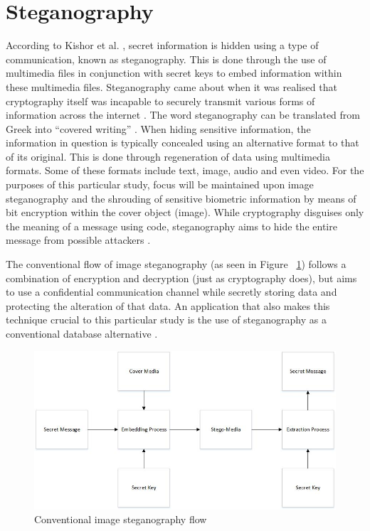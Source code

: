 \section[Steganography]{Steganography}
According to Kishor et al. \cite{Kishor2016}, secret information is hidden using a type of communication, known as steganography. This is done through the use of multimedia files in conjunction with secret keys to embed information within these multimedia files. Steganography came about when it was realised that cryptography itself was incapable to securely transmit various forms of information across the internet \cite{Jain2016}. The word steganography can be translated from Greek into “covered writing” \cite{Pandit2016}. When hiding sensitive information, the information in question is typically concealed using an alternative format to that of its original. This is done through regeneration of data using multimedia formats. Some of these formats include text, image, audio and even video. For the purposes of this particular study, focus will be maintained upon image steganography and the shrouding of sensitive biometric information by means of bit encryption within the cover object (image). While cryptography disguises only the meaning of a message using code, steganography aims to hide the entire message from possible attackers \cite{Kishor2016, Pradhan2016}.

The conventional flow of image steganography (as seen in Figure ~\ref{fig:Conventional image steganography flow}) follows a combination of encryption and decryption (just as cryptography does), but aims to use a confidential communication channel while secretly storing data and protecting the alteration of that data. An application that also makes this technique crucial to this particular study is the use of steganography as a conventional database alternative \cite{Pandit2016}.


  
\begin{figure}[htbp!] 
\centering    
\includegraphics[width=1.0\textwidth]{Chapter2/Figs/Conventional_image_steganography_flow.jpg}
\caption[Conventional image steganography flow]{Conventional image steganography flow}
\label{fig:Conventional image steganography flow}
\end{figure}

